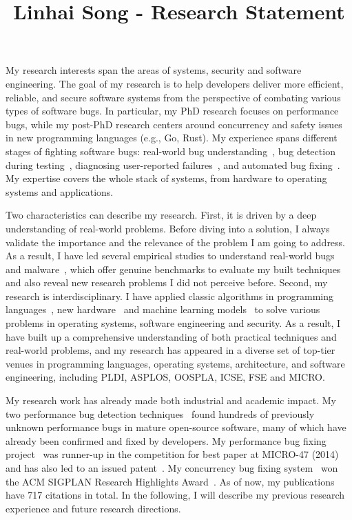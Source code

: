 \documentclass[10pt]{article}
\title{\vspace{-.7in}\bf{Linhai Song - Research Statement\vspace{-.4in}}}
\date{}
\begin{document}
\maketitle\vspace{-.2in}

My research interests span the areas of systems, 
security and software engineering.
The goal of my research is to help developers deliver more efficient, reliable, and secure software systems 
from the perspective of combating various types of software bugs.  
In particular, my PhD research focuses on performance bugs, while my post-PhD
research centers around concurrency and safety issues 
in new programming languages (e.g., Go, Rust).
My experience spans different stages of fighting software bugs:
real-world bug understanding~\cite{jin12perfbug,go-asplos,yu2019fearless,sosp-boqin}, 
bug detection during testing~\cite{jin12perfbug,Nistor13ICSE,icse-boqin}, 
diagnosing user-reported failures~\cite{Song14OOPSLA,Song17ICSE}, 
and automated bug fixing~\cite{jin11afix,Song14MICRO}. 
My expertise covers the whole stack of systems, 
from hardware to operating systems and applications. 

Two characteristics can describe my research. 
First, it is driven by a deep understanding of real-world problems. 
Before diving into a solution, 
I always validate the importance and the relevance of 
the problem I am going to address. 
As a result, I have led several empirical studies to 
understand real-world bugs and 
malware~\cite{jin12perfbug,go-asplos,yu2019fearless,sosp-boqin,Song14OOPSLA,Song17ICSE,Song16ApSys}, 
which offer genuine benchmarks to evaluate my built techniques 
and also reveal new research problems I did not perceive before.
Second, my research is interdisciplinary.
I have applied classic algorithms in programming languages~\cite{salad,icse-boqin,Song17ICSE}, 
new hardware~\cite{Song14MICRO,Song14OOPSLA} and 
machine learning models~\cite{Song16ApSys,Song14OOPSLA,vt-jianjun} 
to solve various problems 
in operating systems, software engineering and security. 
As a result, I have built up a comprehensive understanding of both 
practical techniques and real-world problems, and my research
has appeared in a diverse set of top-tier 
venues in programming languages, 
operating systems, architecture, and software engineering, including 
PLDI, ASPLOS, OOSPLA, ICSE, FSE and MICRO.

My research work has already made both industrial and academic impact. 
My two performance bug detection techniques~\cite{jin12perfbug, Nistor13ICSE} 
found hundreds of previously unknown performance bugs in mature open-source software, 
many of which have already been confirmed and fixed by developers. 
My performance bug fixing project~\cite{Song14MICRO} was 
runner-up in the competition 
for best paper at MICRO-47 (2014)
and has also led to an issued patent~\cite{comppatent}.
My concurrency bug fixing system~\cite{jin11afix} won 
the ACM SIGPLAN Research Highlights Award~\cite{afixnom}. 
As of now, my publications have 717 citations in total. 
In the following, I will describe my previous research experience 
and future research directions. 
\end{document}
